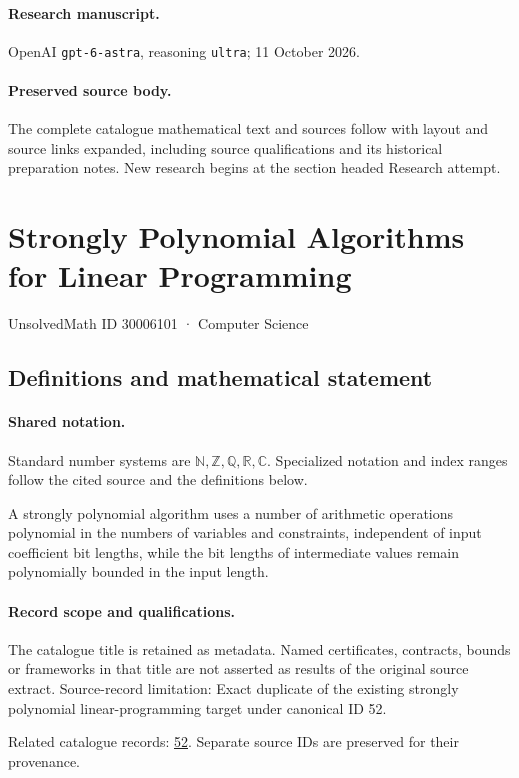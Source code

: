 \documentclass[11pt]{article}
\begin{document}
\paragraph{Research manuscript.} OpenAI \texttt{gpt-6-astra}, reasoning \texttt{ultra}; 11 October 2026.
\paragraph{Preserved source body.} The complete catalogue mathematical text and sources follow with layout and source links expanded, including source qualifications and its historical preparation notes. New research begins at the section headed Research attempt.

\section{Strongly Polynomial Algorithms for Linear Programming}\label{30006101}
{\small UnsolvedMath ID 30006101 · Computer Science}
\subsection{Definitions and mathematical statement}

\paragraph{Shared notation.}Standard number systems are $\mathbb N,\mathbb Z,\mathbb Q,\mathbb R,\mathbb C$. Specialized notation and index ranges follow the cited source and the definitions below.


A strongly polynomial algorithm uses a number of arithmetic operations polynomial in the numbers of variables and constraints, independent of input coefficient bit lengths, while the bit lengths of intermediate values remain polynomially bounded in the input length.
\paragraph{Record scope and qualifications.}
The catalogue title is retained as metadata. Named certificates, contracts, bounds or frameworks in that title are not asserted as results of the original source extract.
Source-record limitation: Exact duplicate of the existing strongly polynomial linear-programming target under canonical ID 52.

Related catalogue records: \href{https://mehmetmars7.github.io/Erdosproblems-llm-hunter/problem.html?type=open_problems&id=52}{52}. Separate source IDs are preserved for their provenance.
\end{document}
